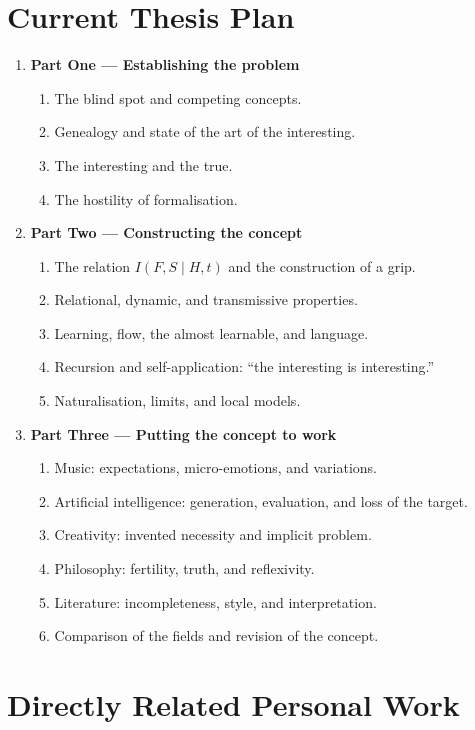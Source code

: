 \documentclass[11pt,a4paper]{article}
\begin{document}
\section{Current Thesis Plan}

\begin{enumerate}
  \item \textbf{Part One --- Establishing the problem}
    \begin{enumerate}
      \item The blind spot and competing concepts.
      \item Genealogy and state of the art of the interesting.
      \item The interesting and the true.
      \item The hostility of formalisation.
    \end{enumerate}
  \item \textbf{Part Two --- Constructing the concept}
    \begin{enumerate}
      \item The relation \(I(F,S\mid H,t)\) and the construction of a grip.
      \item Relational, dynamic, and transmissive properties.
      \item Learning, flow, the almost learnable, and language.
      \item Recursion and self-application: ``the interesting is interesting.''
      \item Naturalisation, limits, and local models.
    \end{enumerate}
  \item \textbf{Part Three --- Putting the concept to work}
    \begin{enumerate}
      \item Music: expectations, micro-emotions, and variations.
      \item Artificial intelligence: generation, evaluation, and loss of the
            target.
      \item Creativity: invented necessity and implicit problem.
      \item Philosophy: fertility, truth, and reflexivity.
      \item Literature: incompleteness, style, and interpretation.
      \item Comparison of the fields and revision of the concept.
    \end{enumerate}
\end{enumerate}

\section{Directly Related Personal Work}
\end{document}
